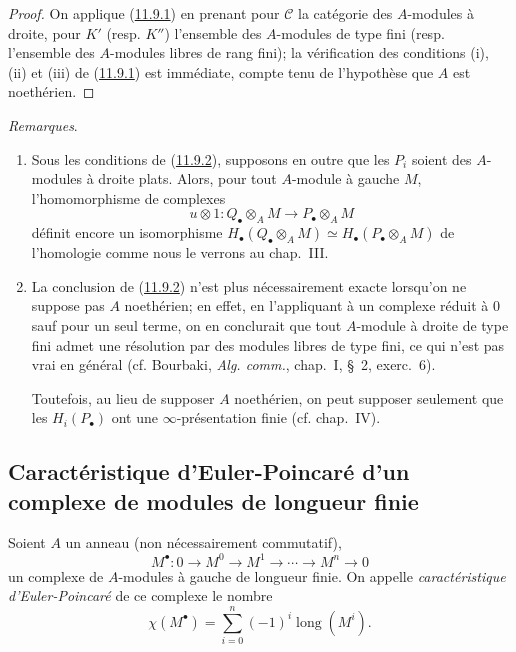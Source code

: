\begin{proof}
On applique (\hyperref[0.11.9.1-fr]{11.9.1}) en prenant pour $\mathcal C$ la
catégorie des $A$-modules à droite, pour $K'$ (resp. $K''$) l'ensemble des
$A$-modules de type fini (resp. l'ensemble des $A$-modules libres de rang
fini); la vérification des conditions (i), (ii) et (iii) de
(\hyperref[0.11.9.1-fr]{11.9.1}) est immédiate, compte tenu de l'hypothèse
que $A$ est noethérien.
\end{proof}

\begin{env}[11.9.3]
\label{0.11.9.3-fr}
\emph{Remarques}.
\begin{enumerate}
\item[{\rm(i)}] Sous les conditions de
(\hyperref[0.11.9.2-fr]{11.9.2}), supposons en outre que les $P_i$ soient des
$A$-modules à droite plats. Alors, pour tout $A$-module à gauche $M$,
l'homomorphisme de complexes
\[
u\otimes 1:Q_\bullet\otimes_A M\longrightarrow P_\bullet\otimes_A M
\]
définit encore un isomorphisme
$H_\bullet(Q_\bullet\otimes_A M)\simeq
H_\bullet(P_\bullet\otimes_A M)$ de l'homologie comme nous le verrons au
chap.~III.
\item[{\rm(ii)}] La conclusion de (\hyperref[0.11.9.2-fr]{11.9.2}) n'est
plus nécessairement exacte lorsqu'on ne suppose pas $A$ noethérien; en
effet, en l'appliquant à un complexe réduit à $0$ sauf pour un seul terme, on
en conclurait que tout $A$-module à droite de type fini admet une résolution
par des modules libres de type fini, ce qui n'est pas vrai en général
(cf. Bourbaki, \emph{Alg. comm.}, chap.~I, \S~2, exerc.~6).

Toutefois, au lieu de supposer $A$ noethérien, on peut supposer seulement que
les $H_i(P_\bullet)$ ont une $\infty$-présentation finie (cf. chap.~IV).
\end{enumerate}
\end{env}

\subsection{Caractéristique d'Euler-Poincaré d'un complexe de modules de
longueur finie}
\label{subsection:0.11.10-fr}

\begin{env}[11.10.1]
\label{0.11.10.1-fr}
Soient $A$ un anneau (non nécessairement commutatif),
\[
\label{0.11.10.1.1-fr}
\tag{11.10.1.1}
M^\bullet:0\longrightarrow M^0\longrightarrow M^1
\longrightarrow\cdots\longrightarrow M^n\longrightarrow0
\]
un complexe de $A$-modules à gauche de longueur finie. On appelle
\emph{caractéristique d'Euler-Poincaré} de ce complexe le nombre
\[
\label{0.11.10.1.2-fr}
\tag{11.10.1.2}
\chi(M^\bullet)=\sum_{i=0}^{n}(-1)^i\operatorname{long}(M^i).
\]
\end{env}

